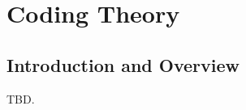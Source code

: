 \chapter{Coding Theory}
\label{ccth0}

\section{Introduction and Overview}
\label{ccth0:siov0}

TBD.

